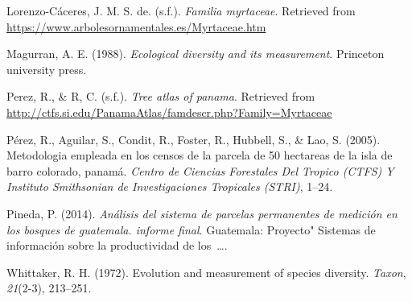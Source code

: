 \documentclass[11pt,]{article}
\begin{document}
\hypertarget{ref-josemyrtaceae}{}
Lorenzo-Cáceres, J. M. S. de. (s.f.). \emph{Familia myrtaceae}.
Retrieved from \url{https://www.arbolesornamentales.es/Myrtaceae.htm}

\hypertarget{ref-magurran1988ecological}{}
Magurran, A. E. (1988). \emph{Ecological diversity and its measurement}.
Princeton university press.

\hypertarget{ref-pereztree}{}
Perez, R., \& R, C. (s.f.). \emph{Tree atlas of panama}. Retrieved from
\url{http://ctfs.si.edu/PanamaAtlas/famdescr.php?Family=Myrtaceae}

\hypertarget{ref-perez2005metodologia}{}
Pérez, R., Aguilar, S., Condit, R., Foster, R., Hubbell, S., \& Lao, S.
(2005). Metodologia empleada en los censos de la parcela de 50 hectareas
de la isla de barro colorado, panamá. \emph{Centro de Ciencias
Forestales Del Tropico (CTFS) Y Instituto Smithsonian de Investigaciones
Tropicales (STRI)}, 1--24.

\hypertarget{ref-pineda2014analisis}{}
Pineda, P. (2014). \emph{Análisis del sistema de parcelas permanentes de
medición en los bosques de guatemala. informe final}. Guatemala:
Proyecto" Sistemas de información sobre la productividad de
los~\ldots{}.

\hypertarget{ref-whittaker1972evolution}{}
Whittaker, R. H. (1972). Evolution and measurement of species diversity.
\emph{Taxon}, \emph{21}(2-3), 213--251.




\newpage
\singlespacing 
\end{document}
